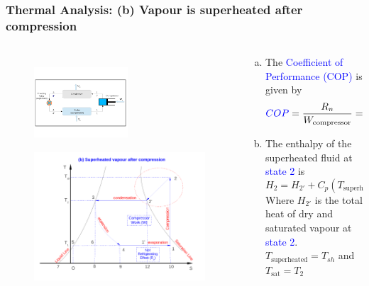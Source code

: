 \documentclass[10pt,compress]{beamer}
\newcommand{\frc}{\displaystyle\frac}
\begin{document}
\begin{frame}
 \frametitle{Thermal Analysis: (b) Vapour is superheated after compression}
 \begin{columns}
  \begin{column}[c]{0.35\linewidth}
   \begin{figure}%
     \vbox{
      \includegraphics[width=3.5cm,height=3.5cm,clip]{./Pics/Overview_Refrig12}
      \vspace{-.6cm}
      \includegraphics[width=4.cm,height=4.cm,clip]{./Pics/Overview_Refrig15}}
   \end{figure}  
  \end{column}  
  \begin{column}[c]{0.65\linewidth}
   \begin{enumerate}[(a)]
    \item <1-> The \textcolor{blue}{Coefficient of Performance (COP)} is given by
      \begin{displaymath}
       \textcolor{blue}{COP}= \frc{R_{n}}{W_{\text{compressor}}}=\textcolor{blue}{\frc{H_{1}-H_{4}}{H_{2}-H_{1}}}
      \end{displaymath}
    \item <2-> The enthalpy of the superheated fluid at \textcolor{blue}{state 2} is
      \begin{displaymath}
        H_{2} = H_{2'} + C_{p}\left(T_{\text{superheated}}-T_{\text{sat}}\right)
      \end{displaymath}
      Where $H_{2'}$ is the total heat of dry and saturated vapour at \textcolor{blue}{state 2}. $T_{\text{superheated}}=T_{sh}$ and $T_{\text{sat}}=T_{2}$
   \end{enumerate}
  \end{column}  
 \end{columns} 
\end{frame}
\end{document}
